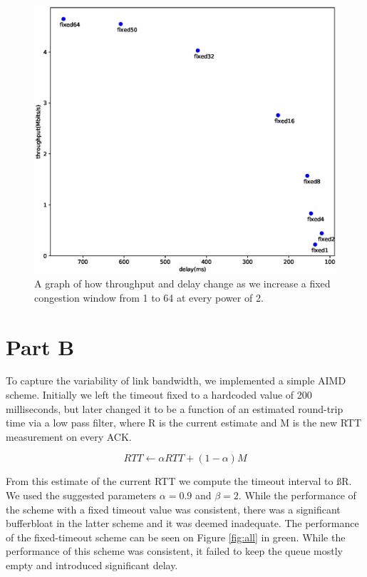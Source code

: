\documentclass[12pt]{article}
\begin{document}
\begin{figure}[h]
 \includegraphics[width=\textwidth,height=\textheight,keepaspectratio]{figure_fixed.eps}
 \caption{A graph of how throughput and delay change as we increase a fixed
 congestion window from 1 to 64 at every power of 2.}
 \label{fig:fixed}
\end{figure}
\section*{Part B}


To capture the variability of link bandwidth, we implemented a simple AIMD
scheme.  Initially we left the timeout fixed to a hardcoded value of 200
milliseconds, but later changed it to be a function of an estimated round-trip
time via a low pass filter, where R is the current estimate and M is the new RTT
measurement on every ACK. \cite{jacobson}

$${RTT} \leftarrow \alpha {RTT} + \left(1 - \alpha\right)M$$

From this estimate of the current RTT we compute the timeout interval to ßR. We
used the suggested parameters $\alpha = 0.9$ and $\beta = 2$. While the
performance of the scheme with a fixed timeout value was consistent, there was a
significant bufferbloat in the  latter scheme and it was deemed inadequate. The
performance of the fixed-timeout scheme can be seen on Figure \ref{fig:all} in green.
While the performance of this scheme was consistent, it failed to keep the queue
mostly empty and introduced significant delay.
\end{document}
